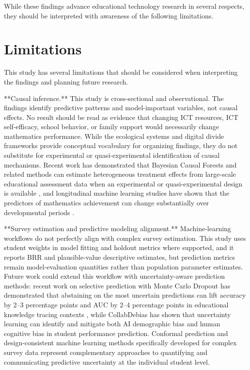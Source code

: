 \documentclass[pdflatex,sn-mathphys-ay]{sn-jnl}
\begin{document}
While these findings advance educational technology research in several respects, they should be interpreted with awareness of the following limitations.

\section{Limitations}

This study has several limitations that should be considered when interpreting the findings and planning future research.

**Causal inference.** This study is cross-sectional and observational. The findings identify predictive patterns and model-important variables, not causal effects. No result should be read as evidence that changing ICT resources, ICT self-efficacy, school behavior, or family support would necessarily change mathematics performance. While the ecological systems and digital divide frameworks provide conceptual vocabulary for organizing findings, they do not substitute for experimental or quasi-experimental identification of causal mechanisms. Recent work has demonstrated that Bayesian Causal Forests and related methods can estimate heterogeneous treatment effects from large-scale educational assessment data when an experimental or quasi-experimental design is available \citep{McJames_2025}, and longitudinal machine learning studies have shown that the predictors of mathematics achievement can change substantially over developmental periods \citep{Lavelle_Hill_2024}.

**Survey estimation and predictive modeling alignment.** Machine-learning workflows do not perfectly align with complex survey estimation. This study uses student weights in model fitting and holdout metrics where supported, and it reports BRR and plausible-value descriptive estimates, but prediction metrics remain model-evaluation quantities rather than population parameter estimates. Future work could extend this workflow with uncertainty-aware prediction methods: recent work on selective prediction with Monte Carlo Dropout has demonstrated that abstaining on the most uncertain predictions can lift accuracy by 2--3 percentage points and AUC by 2--4 percentage points in educational knowledge tracing contexts \citep{Mitton_2026_selective_prediction}, while CollabDebias \citep{Zong_2025_CollabDebias} has shown that uncertainty learning can identify and mitigate both AI demographic bias and human cognitive bias in student performance prediction. Conformal prediction \citep{Angelopoulos_Bates_2021} and design-consistent machine learning methods specifically developed for complex survey data represent complementary approaches to quantifying and communicating predictive uncertainty at the individual student level.
\end{document}
